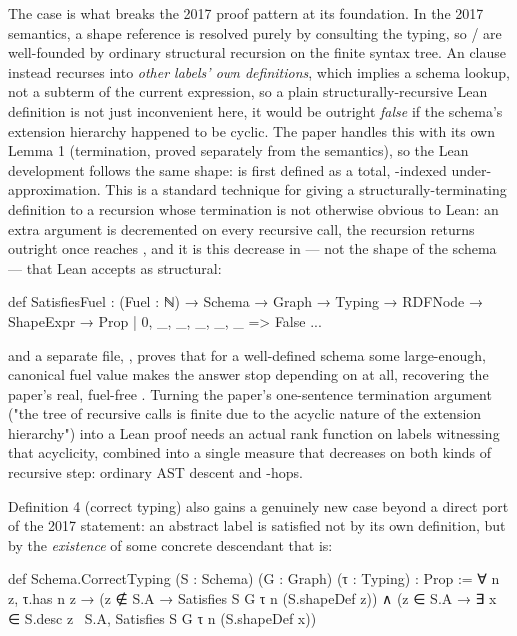The  case is what breaks the 2017 proof pattern at its foundation.
In the 2017 semantics, a shape reference is resolved purely by consulting
the typing, so / are
well-founded by ordinary structural recursion on the finite syntax tree.
An  clause instead recurses into \emph{other labels' own
definitions}, which implies a schema lookup,
not a subterm of the current expression,
so a plain structurally-recursive Lean definition
is not just inconvenient here,
it would be outright \emph{false} if the schema's extension hierarchy
happened to be cyclic.
The paper handles this with its own Lemma 1
(termination, proved separately from the semantics), so the Lean
development follows the same shape: 
is first defined as a
total, -indexed under-approximation. This is a standard technique
for giving a structurally-terminating definition to a recursion whose
termination is not otherwise obvious to Lean: an extra 
argument is decremented on every recursive call, the recursion returns
 outright once  reaches , and it is this
decrease in  — not the shape of the schema — that Lean accepts
as structural:

\begin{leanlisting}
def SatisfiesFuel : (Fuel : ℕ) → Schema → Graph → Typing → RDFNode →
    ShapeExpr → Prop
  | 0, _, _, _, _, _ => False
  ...
\end{leanlisting}

and a separate file, , proves that for a
well-defined schema some large-enough,
canonical fuel value makes the answer stop depending on
 at all, recovering the paper's real,
fuel-free .
Turning the paper's one-sentence termination
argument ("the tree of recursive calls is finite due to the acyclic nature
of the extension hierarchy") into a Lean proof needs an actual rank
function on labels witnessing that acyclicity, combined into a single
measure that decreases on both kinds of recursive step:
ordinary AST descent and -hops.

Definition 4 (correct typing) also gains a genuinely new case beyond a
direct port of the 2017 statement: an abstract label is satisfied not by
its own definition, but by the \emph{existence} of some concrete
descendant that is:

\begin{leanlisting}
def Schema.CorrectTyping (S : Schema) (G : Graph) (τ : Typing) : Prop :=
  ∀ n z, τ.has n z →
    (z ∉ S.A → Satisfies S G τ n (S.shapeDef z)) ∧
    (z ∈ S.A → ∃ x ∈ S.desc z \ S.A, Satisfies S G τ n (S.shapeDef x))
\end{leanlisting}

